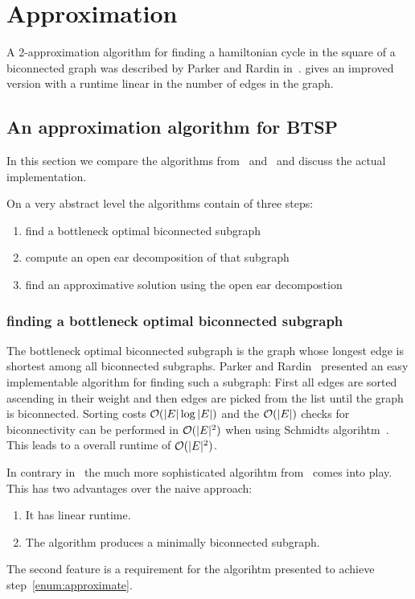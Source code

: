 \chapter{Approximation}

A 2-approximation algorithm for finding a hamiltonian cycle in the square of a biconnected graph was described by Parker and Rardin in~\cite{ParkerRardin1984}. \cite{alstrup2018hamiltonian} gives an improved version with a runtime linear in the number of edges in the graph.

\section{An approximation algorithm for BTSP}
In this section we compare the algorithms from~\cite{ParkerRardin1984} and~\cite{alstrup2018hamiltonian} and discuss the actual implementation.

On a very abstract level the algorithms contain of three steps:
\begin{enumerate}
  \item find a bottleneck optimal biconnected subgraph
  \item compute an open ear decomposition of that subgraph
  \item find an approximative solution using the open ear decompostion\label{enum:approximate}
\end{enumerate}

\subsection{finding a bottleneck optimal biconnected subgraph}
The bottleneck optimal biconnected subgraph is the graph whose longest edge is shortest among all biconnected subgraphs.
Parker and Rardin~\cite{ParkerRardin1984} presented an easy implementable algorithm for finding such a subgraph: First all edges are sorted ascending in their weight and then edges are picked from the list until the graph is biconnected. Sorting costs \(\mathcal{O}(\vert E \vert \log \vert E \vert)\) and the \(\mathcal{O}(\vert E \vert)\) checks for biconnectivity can be performed in \(\mathcal{O}(\vert E \vert^2)\) when using Schmidts algorihtm~\cite{schmidt2013}. This leads to a overall runtime of \(\mathcal{O}(\vert E \vert^2)\).

In contrary in~\cite{alstrup2018hamiltonian} the much more sophisticated algorihtm from~\cite{han1995} comes into play. This has two advantages over the naive approach:
\begin{enumerate}
  \item It has linear runtime.
  \item The algorithm produces a minimally biconnected subgraph.
\end{enumerate}
The second feature is a requirement for the algorihtm presented to achieve step~\ref{enum:approximate}.

